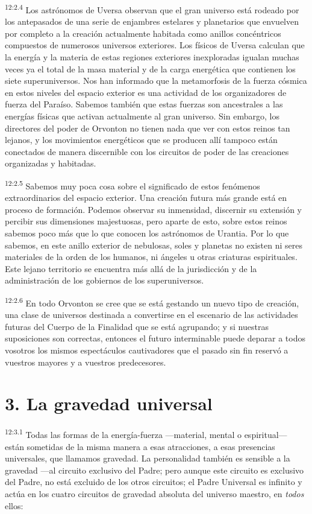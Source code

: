 \par
\textsuperscript{12:2.4} Los astrónomos de Uversa observan que el gran universo está rodeado por los antepasados de una serie de enjambres estelares y planetarios que envuelven por completo a la creación actualmente habitada como anillos concéntricos compuestos de numerosos universos exteriores. Los físicos de Uversa calculan que la energía y la materia de estas regiones exteriores inexploradas igualan muchas veces ya el total de la masa material y de la carga energética que contienen los siete superuniversos. Nos han informado que la metamorfosis de la fuerza cósmica en estos niveles del espacio exterior es una actividad de los organizadores de fuerza del Paraíso. Sabemos también que estas fuerzas son ancestrales a las energías físicas que activan actualmente al gran universo. Sin embargo, los directores del poder de Orvonton no tienen nada que ver con estos reinos tan lejanos, y los movimientos energéticos que se producen allí tampoco están conectados de manera discernible con los circuitos de poder de las creaciones organizadas y habitadas.

\par
\textsuperscript{12:2.5} Sabemos muy poca cosa sobre el significado de estos fenómenos extraordinarios del espacio exterior. Una creación futura más grande está en proceso de formación. Podemos observar su inmensidad, discernir su extensión y percibir sus dimensiones majestuosas, pero aparte de esto, sobre estos reinos sabemos poco más que lo que conocen los astrónomos de Urantia. Por lo que sabemos, en este anillo exterior de nebulosas, soles y planetas no existen ni seres materiales de la orden de los humanos, ni ángeles u otras criaturas espirituales. Este lejano territorio se encuentra más allá de la jurisdicción y de la administración de los gobiernos de los superuniversos.

\par
\textsuperscript{12:2.6} En todo Orvonton se cree que se está gestando un nuevo tipo de creación, una clase de universos destinada a convertirse en el escenario de las actividades futuras del Cuerpo de la Finalidad que se está agrupando; y si nuestras suposiciones son correctas, entonces el futuro interminable puede deparar a todos vosotros los mismos espectáculos cautivadores que el pasado sin fin reservó a vuestros mayores y a vuestros predecesores.

\section*{3. La gravedad universal}
\par
\textsuperscript{12:3.1} Todas las formas de la energía-fuerza ---material, mental o espiritual--- están sometidas de la misma manera a esas atracciones, a esas presencias universales, que llamamos gravedad. La personalidad también es sensible a la gravedad ---al circuito exclusivo del Padre; pero aunque este circuito es exclusivo del Padre, no está excluido de los otros circuitos; el Padre Universal es infinito y actúa en los cuatro circuitos de gravedad absoluta del universo maestro, en \textit{todos} ellos:

